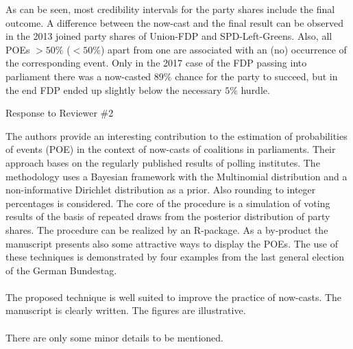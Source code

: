 \documentclass{scrartcl}
\begin{document}
As can be seen, most credibility intervals for the party shares include the final outcome. A difference between the now-cast and the final result can be observed in the 2013 joined party shares of Union-FDP and SPD-Left-Greens. Also, all POEs $>50\%$ ($<50\%$) apart from one are associated with an (no) occurrence of the corresponding event. Only in the 2017 case of the FDP passing into parliament there was a now-casted $89\%$ chance for the party to succeed, but in the end FDP ended up slightly below the necessary $5\%$ hurdle.


\pagebreak
\begin{center}
\large Response to Reviewer \#2
\end{center}
\vspace{5ex}

The authors provide an interesting contribution to the estimation of probabilities of events (POE) in the context of now-casts of coalitions in parliaments. Their approach bases on the regularly published results of polling institutes. The methodology uses a Bayesian framework with the Multinomial distribution and a non-informative Dirichlet distribution as a prior. Also rounding to integer percentages is considered. The core of the procedure is a simulation of voting results of the basis of repeated draws from the posterior distribution of party shares. The procedure can be realized by an R-package. As a by-product the manuscript presents also some attractive ways to display the POEs. The use of these techniques is demonstrated by four examples from the last general election of the German Bundestag.
\\ \\
The proposed technique is well suited to improve the practice of now-casts. The manuscript is clearly written. The figures are illustrative.
\\ \\
There are only some minor details to be mentioned.
\end{document}

